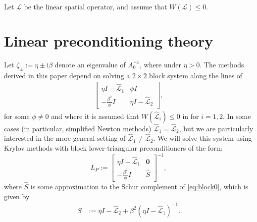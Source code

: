 \documentclass[review]{siamart}
\begin{document}
%
\begin{assumption}\label{ass:fov}
Let $\mathcal{L}$ be the linear spatial operator, and assume that $W(\mathcal{L}) \leq 0$.
\end{assumption}


\section{Linear preconditioning theory}\label{sec:theory}

Let $\zeta_{\pm} := \eta \pm \mathrm{i}\beta$ denote an eigenvalue of $A_0^{-1}$,
where under  $\eta > 0$. The methods derived in this paper depend on
solving a $2\times 2$ block system along the lines of
%
\begin{align}\label{eq:block0}
\begin{bmatrix} \eta I - \widehat{\mathcal{L}}_1 & \phi I\\
-\frac{\beta^2}{\phi} I & \eta I - \widehat{\mathcal{L}}_2\end{bmatrix},
\end{align}
%
for some $\phi \neq 0$ and where it is assumed that $W(\widehat{\mathcal{L}}_i) \leq 0$
in  for $i=1,2$. In some
cases (in particular, simplified Newton methods) $\widehat{\mathcal{L}}_1 =
\widehat{\mathcal{L}}_2$, but we are particularly interested in the more general
setting of $\widehat{\mathcal{L}}_1 \neq \widehat{\mathcal{L}}_2$. We will solve
this system using Krylov methods with block lower-triangular preconditioners of the form
%
\begin{equation}\label{eq:Lprec}
L_P := \begin{bmatrix} \eta I - \widehat{\mathcal{L}}_1 & \mathbf{0} \\ -\frac{\beta^2}{\phi} I
	& \widehat{S}\end{bmatrix}^{-1},
\end{equation}
%
where $\widehat{S}$ is some approximation to the Schur complement of \eqref{eq:block0},
which is given by
%
\begin{align}\label{eq:Schur}
S & := \eta I - \widehat{\mathcal{L}}_2 + \beta^2 (\eta I - \widehat{\mathcal{L}}_1)^{-1}.
\end{align}
%
\end{document}

